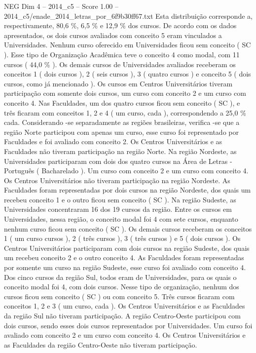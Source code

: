 \begin{textsample}{NEG Dim 4 – 2014\_c5 – Score 1.00 – 2014\_c5/enade\_2014\_letras\_por\_6f9b30ff67.txt}
Esta distribuição corresponde a, respectivamente, 80,6 \%, 6,5 \% e 12,9 \% dos cursos.
De acordo com os dados apresentados, os dois cursos avaliados com conceito 5 eram vinculados a Universidades.
Nenhum curso oferecido em Universidades ficou sem conceito ( SC ).
Esse tipo de Organização Acadêmica teve o conceito 4 como modal, com 11 cursos ( 44,0 \% ).
Os demais cursos de Universidades avaliados receberam os conceitos 1 ( dois cursos ), 2 ( seis cursos ), 3 ( quatro cursos ) e conceito 5 ( dois cursos, como já mencionado ).
Os cursos em Centros Universitários tiveram participação com somente dois cursos, um curso com conceito 2 e um curso com conceito 4.
Nas Faculdades, um dos quatro cursos ficou sem conceito ( SC ), e três ficaram com conceitos 1, 2 e 4 ( um curso, cada ), correspondendo a 25,0 \% cada.
Considerando -se separadamente as regiões brasileiras, verifica -se que a região Norte participou com apenas um curso, esse curso foi representado por Faculdades e foi avaliado com conceito 2.
Os Centros Universitários e as Faculdades não tiveram participação na região Norte.
Na região Nordeste, as Universidades participaram com dois dos quatro cursos na Área de Letras - Português ( Bacharelado ).
Um curso com conceito 2 e um curso com conceito 4.
Os Centros Universitários não tiveram participação na região Nordeste.
As Faculdades foram representadas por dois cursos na região Nordeste, dos quais um recebeu conceito 1 e o outro ficou sem conceito ( SC ).
Na região Sudeste, as Universidades concentraram 16 dos 19 cursos da região.
Entre os cursos em Universidades, nessa região, o conceito modal foi 4 com sete cursos, enquanto nenhum curso ficou sem conceito ( SC ).
Os demais cursos receberam os conceitos 1 ( um curso cursos ), 2 ( três cursos ), 3 ( três cursos ) e 5 ( dois cursos ).
Os Centros Universitários participaram com dois cursos na região Sudeste, dos quais um recebeu conceito 2 e o outro conceito 4.
As Faculdades foram representadas por somente um curso na região Sudeste, esse curso foi avaliado com conceito 4.
Dos cinco cursos da região Sul, todos eram de Universidades, para os quais o conceito modal foi 4, com dois cursos.
Nesse tipo de organização, nenhum dos cursos ficou sem conceito ( SC ) ou com conceito 5.
Três cursos ficaram com conceitos 1, 2 e 3 ( um curso, cada ).
Os Centros Universitários e as Faculdades da região Sul não tiveram participação.
A região Centro-Oeste participou com dois cursos, sendo esses dois cursos representados por Universidades.
Um curso foi avaliado com conceito 2 e um curso com conceito 4.
Os Centros Universitários e as Faculdades da região Centro-Oeste não tiveram participação.

\end{textsample}
